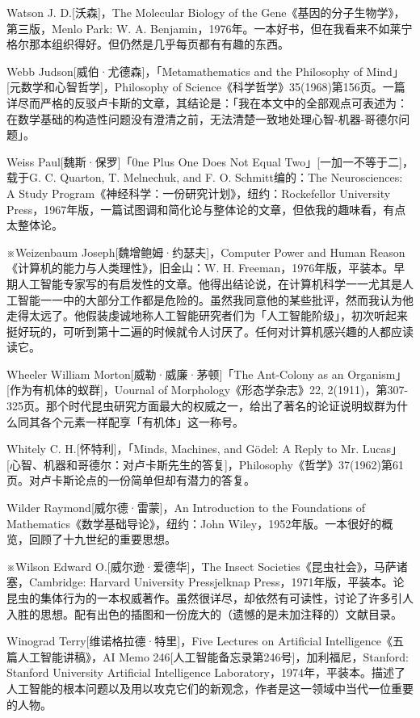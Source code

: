 \documentclass[
  12pt,
  twoside,
  openright,
  oldfontcommands,
]{memoir}
\begin{document}
Watson J. D.{[}沃森{]}，The Molecular Biology of the
Gene《基因的分子生物学》，第三版，Menlo Park: W. A.
Benjamin，1976年。一本好书，但在我看来不如莱宁格尔那本组织得好。但仍然是几乎每页都有有趣的东西。

Webb Judson{[}威伯·尤德森{]}，「Metamathematics and the Philosophy of
Mind」{[}元数学和心智哲学{]}，Philosophy of
Science《科学哲学》35(1968)第156页。一篇详尽而严格的反驳卢卡斯的文章，其结论是：「我在本文中的全部观点可表述为：在数学基础的构造性问题没有澄清之前，无法清楚一致地处理心智-机器-哥德尔问题」。

Weiss Paul{[}魏斯·保罗{]}「0ne Plus One Does Not Equal
Two」{[}一加一不等于二{]}，载于G. C. Quarton, T. Melnechuk, and F. O.
Schmitt编的：The Neurosciences: A Study
Program《神经科学：一份研究计划》，纽约：Rockefellor University
Press，1967年版，一篇试图调和简化论与整体论的文章，但依我的趣味看，有点太整体论。

※Weizenbaum Joseph{[}魏增鲍姆·约瑟夫{]}，Computer Power and Human
Reason《计算机的能力与人类理性》，旧金山：W. H.
Freeman，1976年版，平装本。早期人工智能专家写的有启发性的文章。他得出结论说，在计算机科学一一尤其是人工智能一一中的大部分工作都是危险的。虽然我同意他的某些批评，然而我认为他走得太远了。他假装虔诚地称人工智能研究者们为「人工智能阶级」，初次听起来挺好玩的，可听到第十二遍的时候就令人讨厌了。任何对计算机感兴趣的人都应读读它。

Wheeler William Morton{[}威勒·威廉·茅顿{]}「The Ant-Colony as an
Organism」{[}作为有机体的蚁群{]}，Uournal of Morphology《形态学杂志》22,
2(1911)，第307-325页。那个时代昆虫研究方面最大的权威之一，给出了著名的论证说明蚁群为什么同其各个元素一样配享「有机体」这一称号。

Whitely C. H.{[}怀特利{]}，「Minds, Machines, and Gödel: A Reply to Mr.
Lucas」{[}心智、机器和哥德尔：对卢卡斯先生的答复{]}，Philosophy《哲学》37(1962)第61页。对卢卡斯论点的一份简单但却有潜力的答复。

Wilder Raymond{[}威尔德·雷蒙{]}，An Introduction to the Foundations of
Mathematics《数学基础导论》，纽约：John
Wiley，1952年版。一本很好的概览，回顾了十九世纪的重要思想。

※Wilson Edward O.{[}威尔逊·爱德华{]}，The Insect
Societies《昆虫社会》，马萨诸塞，Cambridge: Harvard University
Pressjelknap
Press，1971年版，平装本。论昆虫的集体行为的一本权威著作。虽然很详尽，却依然有可读性，讨论了许多引人入胜的思想。配有出色的插图和一份庞大的（遗憾的是未加注释的）文献目录。

Winograd Terry{[}维诺格拉德·特里{]}，Five Lectures on Artificial
Intelligence《五篇人工智能讲稿》，AI Memo
246{[}人工智能备忘录第246号{]}，加利福尼，Stanford: Stanford University
Artificial Intelligence
Laboratory，1974年，平装本。描述了人工智能的根本问题以及用以攻克它们的新观念，作者是这一领域中当代一位重要的人物。
\end{document}
